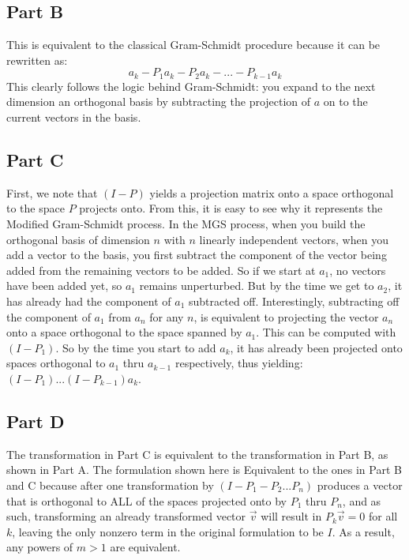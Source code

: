 \documentclass[paper=a4, fontsize=11pt]{scrartcl} %
\numberwithin{equation}{section} %
\numberwithin{figure}{section} %
\numberwithin{table}{section} %
\begin{document}
\subsection*{Part B}
This is equivalent to the classical Gram-Schmidt procedure because it can be rewritten as:
$$
	a_k - P_1a_k - P_2a_k - ... - P_{k - 1}a_k
$$
This clearly follows the logic behind Gram-Schmidt: you expand to the next dimension an orthogonal basis by subtracting the projection of $a$ on to the current vectors in the basis.

\subsection{Part C}
First, we note that $(I - P)$ yields a projection matrix onto a space orthogonal to the space $P$ projects onto. From this, it is easy to see why it represents the Modified Gram-Schmidt process. In the MGS process, when you build the orthogonal basis of dimension $n$ with $n$ linearly independent vectors, when you add a vector to the basis, you first subtract the component of the vector being added from the remaining vectors to be added. So if we start at $a_1$, no vectors have been added yet, so $a_1$ remains unperturbed. But by the time we get to $a_2$, it has already had the component of $a_1$ subtracted off. Interestingly, subtracting off the component of $a_1$ from $a_n$ for any $n$, is equivalent to projecting the vector $a_n$ onto a space orthogonal to the space spanned by $a_1$. This can be computed with $(I - P_1)$. So by the time you start to add $a_k$, it has already been projected onto spaces orthogonal to $a_1$ thru $a_{k-1}$ respectively, thus yielding: $(I - P_1) ... (I - P_{k-1})a_k$.

\subsection{Part D}
The transformation in Part C is equivalent to the transformation in Part B, as shown in Part A. The formulation shown here is Equivalent to the ones in Part B and C because after one transformation by $(I - P_1 - P_2 ... P_n)$ produces a vector that is orthogonal to ALL of the spaces projected onto by $P_1$ thru $P_n$, and as such, transforming an already transformed vector $\vec{v}$ will result in $P_k\vec{v} = 0$ for all $k$, leaving the only nonzero term in the original formulation to be $I$. As a result, any powers of $m > 1$ are equivalent. 


\end{document}
